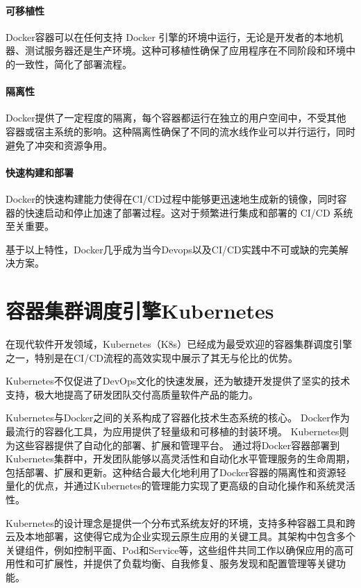 \paragraph{可移植性}Docker容器可以在任何支持 Docker 引擎的环境中运行，无论是开发者的本地机器、测试服务器还是生产环境。这种可移植性确保了应用程序在不同阶段和环境中的一致性，简化了部署流程。

\paragraph{隔离性}Docker提供了一定程度的隔离，每个容器都运行在独立的用户空间中，不受其他容器或宿主系统的影响。这种隔离性确保了不同的流水线作业可以并行运行，同时避免了冲突和资源争用\cite{JSJC201708006}。

\paragraph{快速构建和部署}Docker的快速构建能力使得在CI/CD过程中能够更迅速地生成新的镜像，同时容器的快速启动和停止加速了部署过程。这对于频繁进行集成和部署的 CI/CD 系统至关重要。

基于以上特性，Docker几乎成为当今Devops以及CI/CD实践中不可或缺的完美解决方案\cite{第二章Devops}。

\section{容器集群调度引擎Kubernetes}
在现代软件开发领域，Kubernetes（K8s）已经成为最受欢迎的容器集群调度引擎之一，特别是在CI/CD流程的高效实现中展示了其无与伦比的优势\cite{XTYY202012038}\cite{mahboob2021kubernetes}。

Kubernetes不仅促进了DevOps文化的快速发展，还为敏捷开发提供了坚实的技术支持，极大地提高了研发团队交付高质量软件产品的能力\cite{carrion2022kubernetes}。

Kubernetes与Docker之间的关系构成了容器化技术生态系统的核心\cite{XDDS202202023}。
Docker作为最流行的容器化工具，为应用提供了轻量级和可移植的封装环境。
Kubernetes则为这些容器提供了自动化的部署、扩展和管理平台。
通过将Docker容器部署到Kubernetes集群中，开发团队能够以高灵活性和自动化水平管理服务的生命周期，包括部署、扩展和更新。这种结合最大化地利用了Docker容器的隔离性和资源轻量化的优点，并通过Kubernetes的管理能力实现了更高级的自动化操作和系统灵活性。

Kubernetes的设计理念是提供一个分布式系统友好的环境，支持多种容器工具和跨云及本地部署，这使得它成为企业实现云原生应用的关键工具。其架构中包含多个关键组件，例如控制平面、Pod和Service等，这些组件共同工作以确保应用的高可用性和可扩展性，并提供了负载均衡、自我修复、服务发现和配置管理等关键功能。


